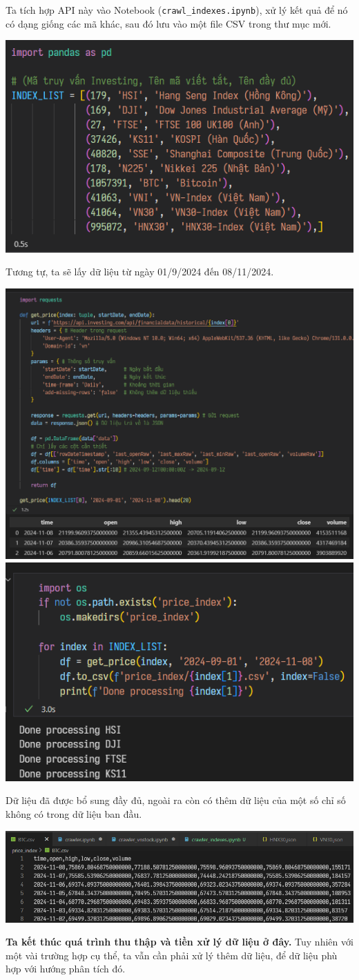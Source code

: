 Ta tích hợp API này vào Notebook (\texttt{crawl\_indexes.ipynb}), xử lý kết quả để nó có dạng giống các mã khác, sau đó lưu vào một file CSV trong thư mục mới.
\begin{center}
    \centering
    \includegraphics[width=0.6\linewidth]{images/code-1.25-crawlinvestingindex.png}
\end{center}


Tương tự, ta sẽ lấy dữ liệu từ ngày 01/9/2024 đến 08/11/2024.
\begin{center}
    \includegraphics[width=0.75\linewidth]{images/code-1.26-crawlinvesting.png}
    \includegraphics[width=0.6\linewidth]{images/code-1.27-crawlinvestingres.png}
    
\end{center}

Dữ liệu đã được bổ sung đầy đủ, ngoài ra còn có thêm dữ liệu của một số chỉ số không có trong dữ liệu ban đầu.
\begin{center}
    \centering
    \includegraphics[width=1\linewidth]{images/code-1.28-crawlbtcresult.png}
\end{center}

\textbf{Ta kết thúc quá trình thu thập và tiền xử lý dữ liệu ở đây.} Tuy nhiên với một vài trường hợp cụ thể, ta vẫn cần phải xử lý thêm dữ liệu, để dữ liệu phù hợp với hướng phân tích đó.